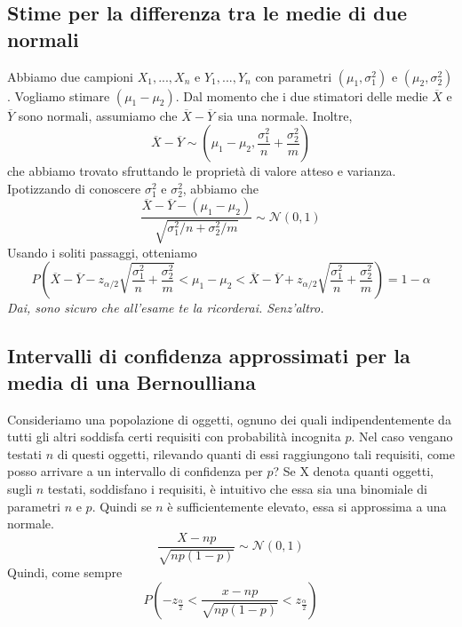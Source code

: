 \documentclass[11pt]{article}
\begin{document}
\subsection{Stime per la differenza tra le medie di due normali}
Abbiamo due campioni $X_1,...,X_n$ e $Y_1,...,Y_n$ con parametri $(\mu_1,\sigma^2_1)$ e $(\mu_2,\sigma^2_2)$. Vogliamo stimare $(\mu_1-\mu_2)$. Dal momento che i due stimatori delle medie $\overline{X}$ e $\overline{Y}$ sono normali, assumiamo che $\overline{X}-\overline{Y}$ sia una normale. Inoltre,
\begin{displaymath}
    \overline{X}-\overline{Y} \sim \left(\mu_1-\mu_2, \frac{\sigma_1^2}{n}+\frac{\sigma_2^2}{m}\right)
\end{displaymath}
che abbiamo trovato sfruttando le proprietà di valore atteso e varianza. 
Ipotizzando di conoscere $\sigma_1^2$ e $\sigma_2^2$, abbiamo che
\begin{displaymath}
    \frac{\overline{X}-\overline{Y} - (\mu_1-\mu_2)}{\sqrt{\sigma_{1}^2/n+\sigma_2^2/m}} \sim \mathcal{N}(0,1)
\end{displaymath}
Usando i soliti passaggi, otteniamo
\begin{displaymath}
    P\left(\overline{X}-\overline{Y}-z_{\alpha/2}\sqrt{\frac{\sigma_1^2}{n}+\frac{\sigma_2^2}{m}}<\mu_1-\mu_2< \overline{X}-\overline{Y}+z_{\alpha/2}\sqrt{\frac{\sigma_1^2}{n}+\frac{\sigma_2^2}{m}}\right) = 1-\alpha
\end{displaymath}
\textit{Dai, sono sicuro che all'esame te la ricorderai. Senz'altro.} 
\subsection{Intervalli di confidenza approssimati per la media di una Bernoulliana}
Consideriamo una popolazione di oggetti, ognuno dei quali indipendentemente da tutti gli altri soddisfa certi requisiti con probabilità incognita $p$. Nel caso vengano testati $n$ di questi oggetti, rilevando quanti di essi raggiungono tali requisiti, come posso arrivare a un intervallo di confidenza per $p$? Se X denota quanti oggetti, sugli $n$ testati, soddisfano i requisiti, è intuitivo che essa sia una binomiale di parametri $n$ e $p$. Quindi se $n$ è sufficientemente elevato, essa si approssima a una normale.
\begin{displaymath}
    \frac{X-np}{\sqrt{np(1-p)}} \sim \mathcal{N}(0,1)
\end{displaymath}
Quindi, come sempre
\begin{displaymath}
    P\left(-z_{\frac{\alpha}{2}} < \frac{x-np}{\sqrt{np(1-p)}} < z_{\frac{\alpha}{2}}\right)
\end{displaymath}
\end{document}
